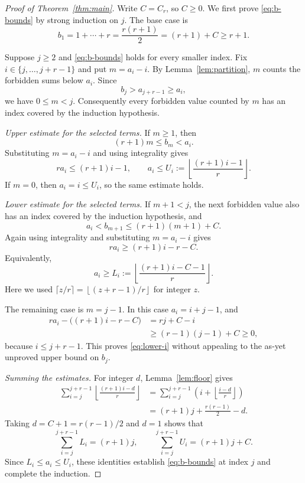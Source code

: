\documentclass[11pt]{article}
\theoremstyle{remark}
\newcommand{\floor}[1]{\left\lfloor #1\right\rfloor}
\begin{document}
\begin{proof}[Proof of Theorem~\ref{thm:main}]
Write $C=C_r$, so $C\ge0$. We first prove \eqref{eq:b-bounds} by strong
induction on $j$. The base case is
\[
b_1=1+\cdots+r=\frac{r(r+1)}2=(r+1)+C\ge r+1.
\]

Suppose $j\ge2$ and \eqref{eq:b-bounds} holds for every smaller index.
Fix $i\in\{j,\ldots,j+r-1\}$ and put $m=a_i-i$. By
Lemma~\ref{lem:partition}, $m$ counts the forbidden sums below $a_i$.
Since
\begin{equation}\label{eq:no-circularity}
b_j>a_{j+r-1}\ge a_i,
\end{equation}
we have $0\le m<j$. Consequently every forbidden value counted by $m$
has an index covered by the induction hypothesis.

\medskip\noindent\textit{Upper estimate for the selected terms.}
If $m\ge1$, then
\[
(r+1)m\le b_m<a_i.
\]
Substituting $m=a_i-i$ and using integrality gives
\[
r a_i\le(r+1)i-1,
\qquad
a_i\le U_i:=\floor{\frac{(r+1)i-1}{r}}.
\]
If $m=0$, then $a_i=i\le U_i$, so the same estimate holds.

\medskip\noindent\textit{Lower estimate for the selected terms.}
If $m+1<j$, the next forbidden value also has an index covered by the
induction hypothesis, and
\[
a_i<b_{m+1}\le(r+1)(m+1)+C.
\]
Again using integrality and substituting $m=a_i-i$ gives
\[
r a_i\ge(r+1)i-r-C.
\]
Equivalently,
\begin{equation}\label{eq:lower-i}
a_i\ge L_i:=\floor{\frac{(r+1)i-C-1}{r}}.
\end{equation}
Here we used $\lceil z/r\rceil=\floor{(z+r-1)/r}$ for integer $z$.

The remaining case is $m=j-1$. In this case $a_i=i+j-1$, and
\[
\begin{aligned}
r a_i-\bigl((r+1)i-r-C\bigr)
&=rj+C-i\\
&\ge(r-1)(j-1)+C\ge0,
\end{aligned}
\]
because $i\le j+r-1$. This proves \eqref{eq:lower-i} without appealing to
the as-yet unproved upper bound on $b_j$.

\medskip\noindent\textit{Summing the estimates.}
For integer $d$, Lemma~\ref{lem:floor} gives
\begin{equation}\label{eq:sum}
\begin{aligned}
\sum_{i=j}^{j+r-1}\floor{\frac{(r+1)i-d}{r}}
&=\sum_{i=j}^{j+r-1}\left(i+\floor{\frac{i-d}{r}}\right)\\
&=(r+1)j+\frac{r(r-1)}2-d.
\end{aligned}
\end{equation}
Taking $d=C+1=r(r-1)/2$ and $d=1$ shows that
\[
\sum_{i=j}^{j+r-1}L_i=(r+1)j,
\qquad
\sum_{i=j}^{j+r-1}U_i=(r+1)j+C.
\]
Since $L_i\le a_i\le U_i$, these identities establish
\eqref{eq:b-bounds} at index $j$ and complete the induction.


\end{proof}
\end{document}
